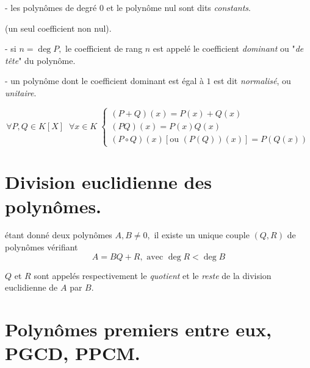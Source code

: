 \documentclass[french]{book}
\begin{document}
\begin{defn}
\qquad - les polyn\^{o}mes de degr\'{e} 0 et le polyn\^{o}me nul sont dits 
\textit{constants}.

(un seul coefficient non nul).

\qquad - si $n=\deg P,$ le coefficient de rang $n$ est appel\'{e} le
coefficient \textit{dominant} ou "\textit{de t\^{e}te}" du polyn\^{o}me.

\qquad - un polyn\^{o}me dont le coefficient dominant est \'{e}gal \`{a} $1$
est dit \textit{normalis\'{e}}, ou \textit{unitaire}.
\end{defn}

\begin{prop}

\begin{equation*}
\forall P,Q\in K[X]\;\;\forall x\in K\;\left\{ 
\begin{array}{c}
\left( P+Q\right) \left( x\right) =P\left( x\right) +Q\left( x\right) \\ 
\left( PQ\right) \left( x\right) =P\left( x\right) Q\left( x\right) \\ 
\left( P\circ Q\right) \left( x\right) [\text{ou }\left( P\left( Q\right)
\right) \left( x\right) ]=P\left( Q\left( x\right) \right)%
\end{array}
\right.
\end{equation*}

\end{prop}
\section{Division euclidienne des polyn\^{o}mes.}

\bigskip

\begin{thm}

 \'{e}tant donn\'{e} deux polyn\^{o}mes $A,B\neq 0,$ il existe un unique
couple $\left( Q,R\right) $ de polyn\^{o}mes v\'{e}rifiant 
\begin{equation*}
A=BQ+R,\text{ avec }\deg R<\deg B
\end{equation*}

$Q$ et $R$ sont appel\'{e}s respectivement le \textit{quotient} et le 
\textit{reste} de la division euclidienne de $A$ par $B.$

\end{thm}

\section{Polyn\^{o}mes premiers entre eux, PGCD, PPCM.}
\end{document}
